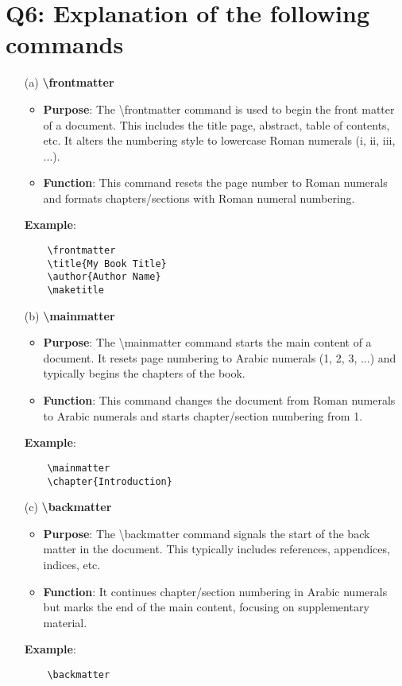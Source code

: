\section*{Q6: Explanation of the following commands}

\begin{enumerate}
    \item[(a)] \textbf{\textbackslash frontmatter}
    \begin{itemize}
        \item \textbf{Purpose}: The \textbackslash frontmatter command is used to begin the front matter of a document. This includes the title page, abstract, table of contents, etc. It alters the numbering style to lowercase Roman numerals (i, ii, iii, ...).
        \item \textbf{Function}: This command resets the page number to Roman numerals and formats chapters/sections with Roman numeral numbering.
    \end{itemize}
    \textbf{Example}:
    \begin{verbatim}
    \frontmatter
    \title{My Book Title}
    \author{Author Name}
    \maketitle
    \end{verbatim}

    \item[(b)] \textbf{\textbackslash mainmatter}
    \begin{itemize}
        \item \textbf{Purpose}: The \textbackslash mainmatter command starts the main content of a document. It resets page numbering to Arabic numerals (1, 2, 3, ...) and typically begins the chapters of the book.
        \item \textbf{Function}: This command changes the document from Roman numerals to Arabic numerals and starts chapter/section numbering from 1.
    \end{itemize}
    \textbf{Example}:
    \begin{verbatim}
    \mainmatter
    \chapter{Introduction}
    \end{verbatim}

    \item[(c)] \textbf{\textbackslash backmatter}
    \begin{itemize}
        \item \textbf{Purpose}: The \textbackslash backmatter command signals the start of the back matter in the document. This typically includes references, appendices, indices, etc.
        \item \textbf{Function}: It continues chapter/section numbering in Arabic numerals but marks the end of the main content, focusing on supplementary material.
    \end{itemize}
    \textbf{Example}:
    \begin{verbatim}
    \backmatter

\end{verbatim}
\end{enumerate}
